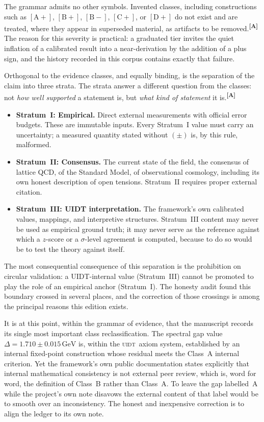 \documentclass[12pt,a4paper,twoside]{article}
\theoremstyle{plain}
\theoremstyle{definition}
\theoremstyle{remark}
\newcommand{\UIDT}{\textsc{uidt}}
\newcommand{\GeV}{\,\mathrm{GeV}}
\newcommand{\catmark}[1]{\textsuperscript{\textsf{\textbf{[#1]}}}}
\newcommand{\DeltaGap}{1.710 \pm 0.015\GeV} %
\begin{document}
The grammar admits no other symbols. Invented classes, including constructions such as $[\mathrm{A+}]$, $[\mathrm{B+}]$, $[\mathrm{B-}]$, $[\mathrm{C+}]$, or $[\mathrm{D+}]$ do not exist and are treated, where they appear in superseded material, as artifacts to be removed.\catmark{A} The reason for this severity is practical: a graduated tier invites the quiet inflation of a calibrated result into a near-derivation by the addition of a plus sign, and the history recorded in this corpus contains exactly that failure.

Orthogonal to the evidence classes, and equally binding, is the separation of the claim into three strata. The strata answer a different question from the classes: not \emph{how well supported} a statement is, but \emph{what kind of statement} it is.\catmark{A}

\begin{itemize}[leftmargin=2.2em]
 \item \textbf{Stratum~I: Empirical.} Direct external measurements with official error budgets. These are immutable inputs. Every Stratum~I value must carry an uncertainty; a measured quantity stated without $(\pm)$ is, by this rule, malformed.
 \\
 \item \textbf{Stratum~II: Consensus.} The current state of the field, the consensus of lattice QCD, of the Standard Model, of observational cosmology, including its own honest description of open tensions. Stratum~II requires proper external citation. \item \textbf{Stratum~III: UIDT interpretation.} The framework's own calibrated values, mappings, and interpretive structures. Stratum~III content may never be used as empirical ground truth; it may never serve as the reference against which a $z$-score or a $\sigma$-level agreement is computed, because to do so would be to test the theory against itself.
\end{itemize}

The most consequential consequence of this separation is the prohibition on circular validation: a UIDT-internal value (Stratum~III) cannot be promoted to play the role of an empirical anchor (Stratum~I). The honesty audit found this boundary crossed in several places, and the correction of those crossings is among the principal reasons this edition exists.

It is at this point, within the grammar of evidence, that the manuscript records its single most important class reclassification. The spectral gap value $\Delta = \DeltaGap$ is, within the \UIDT\ axiom system, established by an internal fixed-point construction whose residual meets the Class~A internal criterion. Yet the framework's own public documentation states explicitly that internal mathematical consistency is not external peer review, which is, word for word, the definition of Class~B rather than Class~A. To leave the gap labelled~A while the project's own note disavows the external content of that label would be to smooth over an inconsistency. The honest and inexpensive correction is to align the ledger to its own note.
\end{document}
